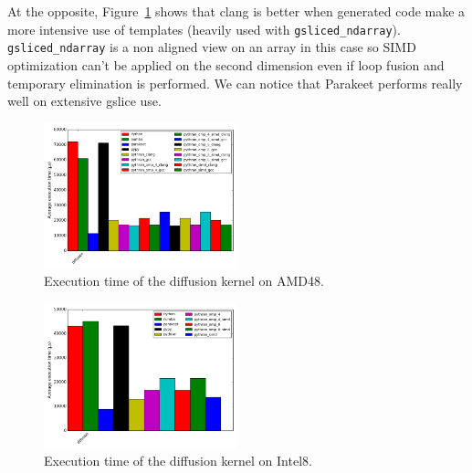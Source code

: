 \documentclass[10pt, preprint]{sigplanconf}
\begin{document}
At the opposite, Figure~\ref{fig:diffusion} shows that clang is better when generated
code make a more intensive use of templates (heavily used with \texttt{gsliced\_ndarray}).
\texttt{gsliced\_ndarray} is a non aligned view on an array in this case so SIMD optimization
can't be applied on the second dimension even if loop fusion and temporary
elimination is performed.  We can notice that Parakeet performs really well on
extensive gslice use.

\begin{figure}[t]
\centering
\includegraphics[width=0.5\textwidth]{diffusion_amd48.png}
\caption{Execution time of the diffusion kernel on AMD48.}
\label{fig:diffusion}
\end{figure}

\begin{figure}[t]
\centering
\includegraphics[width=0.5\textwidth]{diffusion_intel8.png}
\caption{Execution time of the diffusion kernel on Intel8.}
\label{fig:diffusion_intel8}
\end{figure}
\end{document}
